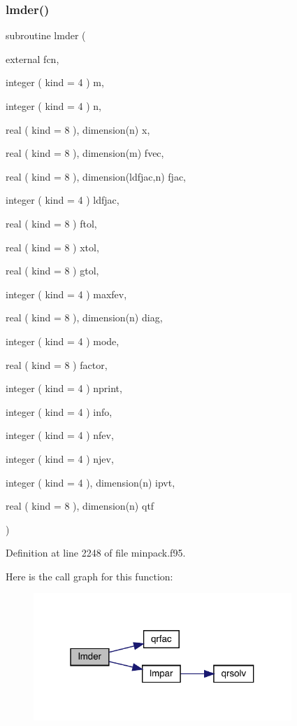 \subsubsection{\texorpdfstring{lmder()}{lmder()}}
{\footnotesize\ttfamily subroutine lmder (\begin{DoxyParamCaption}\item[{external}]{fcn,  }\item[{integer ( kind = 4 )}]{m,  }\item[{integer ( kind = 4 )}]{n,  }\item[{real ( kind = 8 ), dimension(n)}]{x,  }\item[{real ( kind = 8 ), dimension(m)}]{fvec,  }\item[{real ( kind = 8 ), dimension(ldfjac,n)}]{fjac,  }\item[{integer ( kind = 4 )}]{ldfjac,  }\item[{real ( kind = 8 )}]{ftol,  }\item[{real ( kind = 8 )}]{xtol,  }\item[{real ( kind = 8 )}]{gtol,  }\item[{integer ( kind = 4 )}]{maxfev,  }\item[{real ( kind = 8 ), dimension(n)}]{diag,  }\item[{integer ( kind = 4 )}]{mode,  }\item[{real ( kind = 8 )}]{factor,  }\item[{integer ( kind = 4 )}]{nprint,  }\item[{integer ( kind = 4 )}]{info,  }\item[{integer ( kind = 4 )}]{nfev,  }\item[{integer ( kind = 4 )}]{njev,  }\item[{integer ( kind = 4 ), dimension(n)}]{ipvt,  }\item[{real ( kind = 8 ), dimension(n)}]{qtf }\end{DoxyParamCaption})}



Definition at line 2248 of file minpack.\+f95.

Here is the call graph for this function\+:\nopagebreak
\begin{figure}[H]
\begin{center}
\leavevmode
\includegraphics[width=277pt]{minpack_8f95_a29cf549303bc0ced9cb2e1ef2da0234b_cgraph}
\end{center}
\end{figure}
\mbox{\label{minpack_8f95_ab4dbf9a20a957dfb72d70219dd6ad6d4}} 
